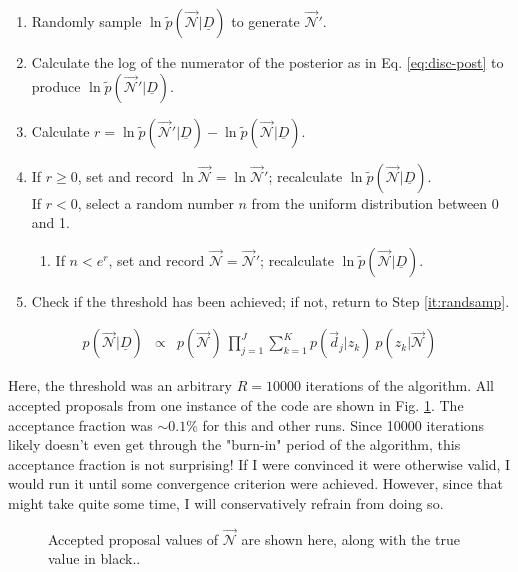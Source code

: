 \documentclass[12pt, onecolumn]{emulateapj}
\newcommand{\textul}{\underline}
\begin{document}
\begin{enumerate}
\item \label{it:randsamp} Randomly sample $\ln\tilde{p}(\vec{\mathcal{N}}|\textul{D})$ to generate $\vec{\mathcal{N}}'$.
\item Calculate the log of the numerator of the posterior as in Eq. \ref{eq:disc-post} to produce $\ln\tilde{p}(\vec{\mathcal{N}}'|\textul{D})$.
\item Calculate $r=\ln\tilde{p}(\vec{\mathcal{N}}'|\textul{D})-\ln\tilde{p}(\vec{\mathcal{N}}|\textul{D})$.
\item If $r\geq0$, set and record $\ln\vec{\mathcal{N}}=\ln\vec{\mathcal{N}}'$; recalculate $\ln\tilde{p}(\vec{\mathcal{N}}|\textul{D})$.\\
If $r<0$, select a random number $n$ from the uniform distribution between 0 and 1.
\begin{enumerate}
\item If $n<e^{r}$, set and record $\vec{\mathcal{N}}=\vec{\mathcal{N}}'$; recalculate $\ln\tilde{p}(\vec{\mathcal{N}}|\textul{D})$.
\end{enumerate}
\item Check if the threshold has been achieved; if not, return to Step \ref{it:randsamp}.
\end{enumerate}

\begin{eqnarray}
\label{eq:disc-post}
p(\vec{\mathcal{N}}|\textul{D}) &\propto& p(\vec{\mathcal{N}})\  \prod_{j=1}^{J}\sum_{k=1}^{K}p(\vec{d}_{j}|z_{k})\ p(z_{k}|\vec{\mathcal{N}})
\end{eqnarray}

Here, the threshold was an arbitrary $R=10000$ iterations of the algorithm.  All accepted proposals from one instance of the code are shown in Fig. \ref{fig:results}.  The acceptance fraction was $\sim0.1\%$ for this and other runs.  Since 10000 iterations likely doesn't even get through the "burn-in" period of the algorithm, this acceptance fraction is not surprising!  If I were convinced it were otherwise valid, I would run it until some convergence criterion were achieved.  However, since that might take quite some time, I will conservatively refrain from doing so.

\begin{figure}
\label{fig:results}
\caption{Accepted proposal values of $\vec{\mathcal{N}}$ are shown here, along with the true value in black..}
\end{figure}
\end{document}
